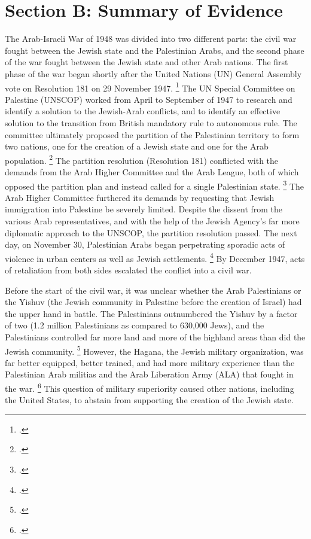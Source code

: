 \documentclass[12pt]{turabian-researchpaper}
\begin{document}
\section{Section B: Summary of Evidence}
The Arab-Israeli War of 1948 was divided into two different parts: the civil war fought between the Jewish state and the Palestinian Arabs, and the second phase of the war fought between the Jewish state and other Arab nations.  The first phase of the war began shortly after the United Nations (UN) General Assembly vote on Resolution 181 on 29 November 1947.
\footcite[][]{tal}
The UN Special Committee on Palestine (UNSCOP) worked from April to September of 1947 to research and identify a solution to the Jewish-Arab conflicts, and to identify an effective solution to the transition from British mandatory rule to autonomous rule.  The committee ultimately proposed the partition of the Palestinian territory to form two nations, one for the creation of a Jewish state and one for the Arab population.
\footcite[][22]{pappe}
The partition resolution (Resolution 181) conflicted with the demands from the Arab Higher Committee and the Arab League, both of which opposed the partition plan and instead called for a single Palestinian state.
\footcite[][23]{pappe}
The Arab Higher Committee furthered its demands by requesting that Jewish immigration into Palestine be severely limited.  Despite the dissent from the various Arab representatives, and with the help of the Jewish Agency's far more diplomatic approach to the UNSCOP, the partition resolution passed.  The next day, on November 30, Palestinian Arabs began perpetrating sporadic acts of violence in urban centers as well as Jewish settlements.
\footcite[][77]{morris}
By December 1947, acts of retaliation from both sides escalated the conflict into a civil war.



Before the start of the civil war, it was unclear whether the Arab Palestinians or the Yishuv (the Jewish community in Palestine before the creation of Israel) had the upper hand in battle.  The Palestinians outnumbered the Yishuv by a factor of two (1.2 million Palestinians as compared to 630,000 Jews), and the Palestinians controlled far more land and more of the highland areas than did the Jewish community.
\footcite[][30]{bartal}
However, the Hagana, the Jewish military organization, was far better equipped, better trained, and had more military experience than the Palestinian Arab militias and the Arab Liberation Army (ALA) that fought in the war.
\footcite[][81]{morris}
This question of military superiority caused other nations, including the United States, to abstain from supporting the creation of the Jewish state.
\end{document}
